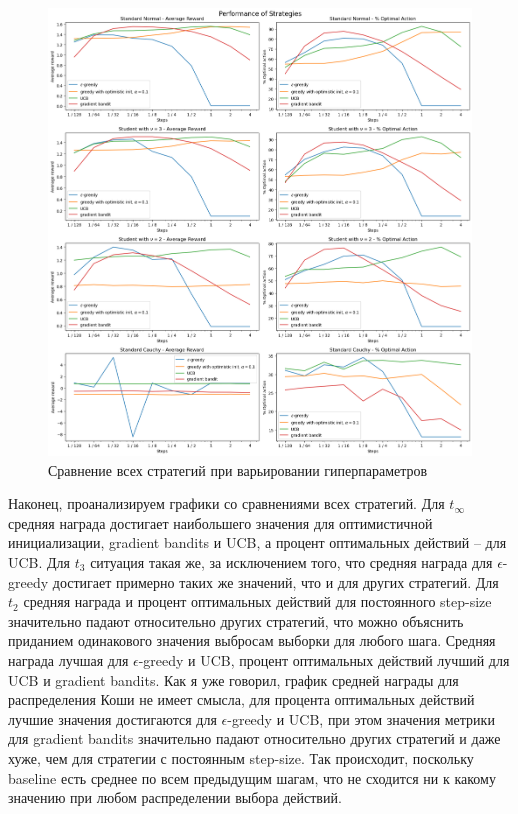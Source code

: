 \documentclass{article}
\begin{document}
\begin{figure}
    \centering
    \includegraphics[width=1.1\linewidth]{overall.png}
    \caption{\label{fig:overall}Сравнение всех стратегий при варьировании гиперпараметров}
\end{figure}

Наконец, проанализируем графики со сравнениями всех стратегий. Для $t_{\infty}$ средняя награда достигает наибольшего значения для оптимистичной инициализации, gradient bandits и UCB, а процент оптимальных действий -- для UCB. Для $t_3$ ситуация такая же, за исключением того, что средняя награда для $\epsilon$-greedy достигает примерно таких же значений, что и для других стратегий. Для $t_2$ средняя награда и процент оптимальных действий для постоянного step-size значительно падают относительно других стратегий, что можно объяснить приданием одинакового значения выбросам выборки для любого шага. Средняя награда лучшая для $\epsilon$-greedy и UCB, процент оптимальных действий лучший для UCB и gradient bandits. Как я уже говорил, график средней награды для распределения Коши не имеет смысла, для процента оптимальных действий лучшие значения достигаются для $\epsilon$-greedy и UCB, при этом значения метрики для gradient bandits значительно падают относительно других стратегий и даже хуже, чем для стратегии с постоянным step-size. Так происходит, поскольку baseline есть среднее по всем предыдущим шагам, что не сходится ни к какому значению при любом распределении выбора действий.
\end{document}
